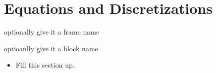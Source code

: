 \section{Equations and Discretizations}
\begin{frame}{optionally give it a frame name}
	\begin{block}{optioanlly give it a block name}
		\begin{itemize}
			\item Fill this section up.
		\end{itemize}
	\end{block}
\end{frame}
